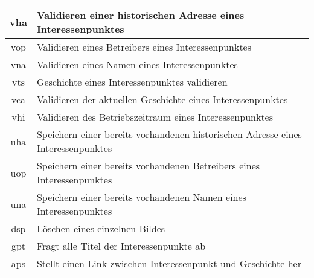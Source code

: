 \begin{longtable}[H]{|c|p{12cm}|}
		vha                 & Validieren einer historischen Adresse eines Interessenpunktes                                                                                      \\ \hline
		vop                 & Validieren eines Betreibers eines Interessenpunktes                                                                                                \\ \hline
		vna                 & Validieren eines Namen eines Interessenpunktes                                                                                                     \\ \hline
		vts                 & Geschichte eines Interessenpunktes validieren                                                                                                      \\ \hline
		vca                 & Validieren der aktuellen Geschichte eines Interessenpunktes                                                                                        \\ \hline
		vhi                 & Validieren des Betriebszeitraum eines Interessenpunktes                                                                                            \\ \hline
		uha                 & Speichern einer bereits vorhandenen historischen Adresse eines Interessenpunktes                                                                   \\ \hline
		uop                 & Speichern einer bereits vorhandenen Betreibers eines Interessenpunktes                                                                             \\ \hline
		una                 & Speichern einer bereits vorhandenen Namen eines Interessenpunktes                                                                                  \\ \hline
		dsp                 & Löschen eines einzelnen Bildes                                                                                                                     \\ \hline
		gpt                 & Fragt alle Titel der Interessenpunkte ab                                                                                                           \\ \hline
		aps                 & Stellt einen Link zwischen Interessenpunkt und Geschichte her                                                                                      \\ \hline

\end{longtable}
